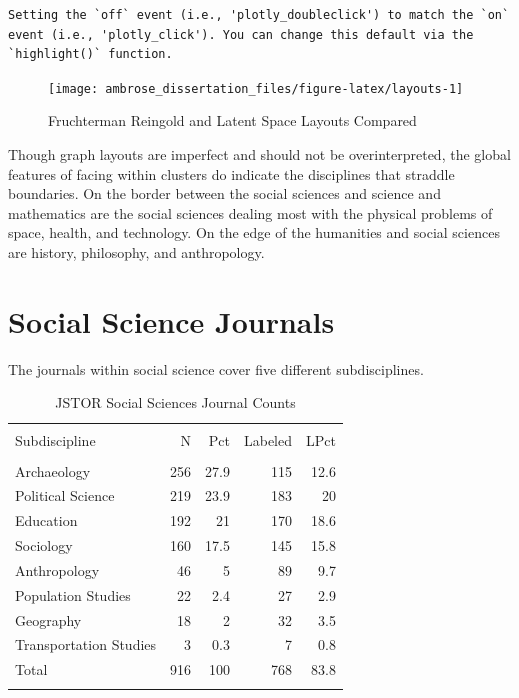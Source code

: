 \documentclass[]{book}
\begin{document}
\begin{verbatim}
Setting the `off` event (i.e., 'plotly_doubleclick') to match the `on` event (i.e., 'plotly_click'). You can change this default via the `highlight()` function.
\end{verbatim}

\begin{figure}

{\centering \texttt{[image: ambrose\_dissertation\_files/figure-latex/layouts-1]} 

}

\caption{Fruchterman Reingold and Latent Space Layouts Compared}\label{fig:layouts}
\end{figure}

Though graph layouts are imperfect and should not be overinterpreted,
the global features of facing within clusters do indicate the
disciplines that straddle boundaries. On the border between the social
sciences and science and mathematics are the social sciences dealing
most with the physical problems of space, health, and technology. On the
edge of the humanities and social sciences are history, philosophy, and
anthropology.

\section{Social Science Journals}\label{kd-dq2}

The journals within social science cover five different subdisciplines.

\begin{table}[!htbp] \centering 
  \caption{JSTOR Social Sciences Journal Counts} 
  \label{tab:jclu-tab-sub} 
\begin{tabular}{@{\extracolsep{5pt}} lrrrr} 
\\[-1.8ex]\hline 
\hline \\[-1.8ex] 
Subdiscipline & N & Pct & Labeled & LPct \\ 
\hline \\[-1.8ex] 
Archaeology & 256 & 27.9 & 115 & 12.6 \\ 
Political Science & 219 & 23.9 & 183 & 20 \\ 
Education & 192 & 21 & 170 & 18.6 \\ 
Sociology & 160 & 17.5 & 145 & 15.8 \\ 
Anthropology & 46 & 5 & 89 & 9.7 \\ 
Population Studies & 22 & 2.4 & 27 & 2.9 \\ 
Geography & 18 & 2 & 32 & 3.5 \\ 
Transportation Studies & 3 & 0.3 & 7 & 0.8 \\ 
Total & 916 & 100 & 768 & 83.8 \\ 
\hline \\[-1.8ex] 
\end{tabular} 
\end{table}
\end{document}
